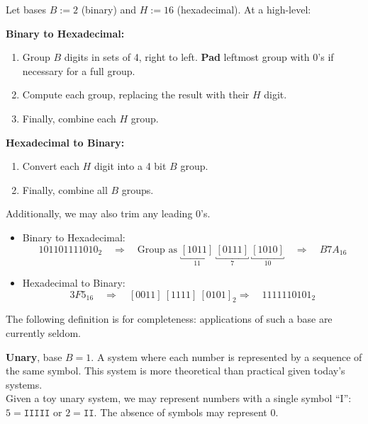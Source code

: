 \begin{theo}

    Let bases \( B:=2 \) (binary) and \( H:=16 \) (hexadecimal). At a high-level:

    \vspace{.5em}
    
    \noindent \textbf{Binary to Hexadecimal:}
    \begin{enumerate}
        \item Group $B$ digits in sets of 4, right to left. \textbf{Pad} leftmost group with 0's if necessary for a full group.
        \item Compute each group, replacing the result with their $H$ digit.
        \item Finally, combine each $H$ group.
    \end{enumerate}
    
    \noindent \textbf{Hexadecimal to Binary:}
    \begin{enumerate}
        \item Convert each $H$ digit into a 4 bit $B$ group.
        \item Finally, combine all $B$ groups.
    \end{enumerate}
    \noindent
    Additionally, we may also trim any leading 0's.
\end{theo}

\noindent
\begin{Example}
    \begin{itemize}
        \item Binary to Hexadecimal:
        \[
        101101111010_2 \quad \Rightarrow \quad \text{Group as } \underbracket{[1011]}_{11} \ \underbracket{[0111]}_{7} \ \underbracket{[1010]}_{10} \quad \Rightarrow \quad B7A_{16}
        \]
        \item Hexadecimal to Binary:
        \[
        3F5_{16} \quad \Rightarrow \quad [0011]\ [1111]\ [0101]_2 \Rightarrow \quad 1111110101_2
        \]
        \noindent
    \end{itemize}

\end{Example}

\noindent
The following definition is for completeness: applications of such a base are currently seldom.
\begin{Def}[Unary]
    
    \textbf{Unary}, base $B=1$. A system where each number is represented by a sequence of the same symbol. 
    This system is more theoretical than practical given today's systems.\\

    \noindent
    Given a toy unary system, we may represent numbers with a single symbol ``I'': $5 = \texttt{IIIII}$ or $2= \texttt{II}$. 
    The absence of symbols may represent 0.
\end{Def}

